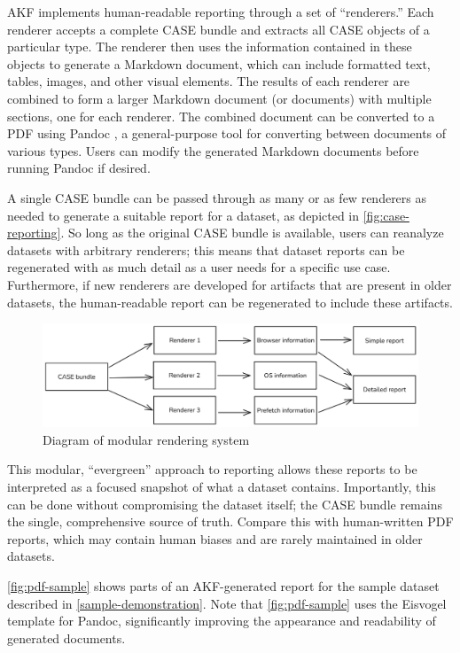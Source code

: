 \documentclass[final,5p,times,twocolumn]{elsarticle}
\begin{document}
AKF implements human-readable reporting through a set of ``renderers.''
Each renderer accepts a complete CASE bundle and extracts all CASE
objects of a particular type. The renderer then uses the information
contained in these objects to generate a Markdown document, which can
include formatted text, tables, images, and other visual elements. The
results of each renderer are combined to form a larger Markdown document
(or documents) with multiple sections, one for each renderer. The
combined document can be converted to a PDF using Pandoc
\cite{macfarlanePandoc2025}, a general-purpose tool for converting
between documents of various types. Users can modify the generated
Markdown documents before running Pandoc if desired.

A single CASE bundle can be passed through as many or as few renderers
as needed to generate a suitable report for a dataset, as depicted in
\autoref{fig:case-reporting}. So long as the original CASE bundle is
available, users can reanalyze datasets with arbitrary renderers; this
means that dataset reports can be regenerated with as much detail as a
user needs for a specific use case. Furthermore, if new renderers are
developed for artifacts that are present in older datasets, the
human-readable report can be regenerated to include these artifacts.

\begin{figure}[htbp]
\centering
\includegraphics[width=1\linewidth]{case-reporting.png}
\caption{Diagram of modular rendering system}\label{fig:case-reporting}
\end{figure}

This modular, ``evergreen'' approach to reporting allows these reports
to be interpreted as a focused snapshot of what a dataset contains.
Importantly, this can be done without compromising the dataset itself;
the CASE bundle remains the single, comprehensive source of truth.
Compare this with human-written PDF reports, which may contain human
biases and are rarely maintained in older datasets.

\autoref{fig:pdf-sample} shows parts of an AKF-generated report for the
sample dataset described in \autoref{sample-demonstration}. Note that
\autoref{fig:pdf-sample} uses the Eisvogel template
\cite{waglerWandmalfarbePandoclatextemplate2025} for Pandoc,
significantly improving the appearance and readability of generated
documents.
\end{document}
